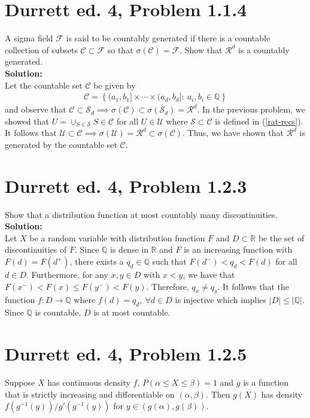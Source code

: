 \documentclass[12pt]{article}
\newcommand{\Sd}{\mathcal{S}_d}
\newcommand{\U}{\mathcal{U}}
\begin{document}
    \section*{Durrett ed. 4, Problem 1.1.4}
    A sigma field $\mathcal F$ is said to be countably generated if there is a countable collection of subsets $\mathscr C\subset \mathcal F$
    so that $\sigma(\mathscr C) = \mathcal F$. Show that $\mathcal R^d$ is a countably generated.\\

    \textbf{Solution:}\\
    Let the countable set $\mathscr C$ be given by
    \begin{align}
        \mathscr C = \left\{(a_1, b_1]\times\cdots\times(a_d, b_d]: \ a_i, b_i\in\mathbb Q\right\}
    \end{align}
    and observe that $\mathscr C\subset\Sd\implies\sigma(\mathscr C)\subset\sigma(\Sd) = \mathcal R^d$. In the previous problem, we showed that
    $U = \cup_{S\in\mathscr S}S\in\mathscr C$ for all $U\in\U$ where $\mathscr S\subset \mathscr C$ is defined in (\ref{rat-recs}). 
    It follows that $\U\subset\mathscr C\implies \sigma(\U) = \mathcal R^d \subset\sigma(\mathscr C)$.
    Thus, we have shown that $\mathcal R^d$ is generated by the countable set $\mathscr C$.

    \section*{Durrett ed. 4, Problem 1.2.3}
    Show that a distribution function at most countably many discontinuities.\\

    \textbf{Solution:}\\
    Let $X$ be a random variable with distribution function $F$ and $D\subset \mathbb R$ be the set of discontinuities of $F$.
    Since $\mathbb Q$ is dense in $\mathbb R$ and $F$ is an increasing function with $F(d) = F(d^+)$, there exists a $q_d\in\mathbb Q$ such that 
    $F(d^-) < q_d < F(d)$ for all $d\in D$. Furthermore, for any $x, y\in D$ with $x < y$, we have that $F(x^-) < F(x) \leq F(y^-) < F(y)$.
    Therefore, $q_x \neq q_y$. It follows that the function $f: D\to\mathbb Q$ where $f(d) = q_d, \ \forall d\in D$ is injective
    which implies $|D| \leq |\mathbb Q|$. Since $\mathbb Q$ is countable, $D$ is at most countable.

    \section*{Durrett ed. 4, Problem 1.2.5}
    Suppose $X$ has continuous density $f$, $P(\alpha \leq X \leq \beta) = 1$ and $g$ is a function that is strictly increasing and differentiable on $(\alpha, \beta)$.
    Then $g(X)$ has density $f(g^{-1}(y)) / g'(g^{-1}(y))$ for $y\in(g(\alpha), g(\beta))$.\\
\end{document}
